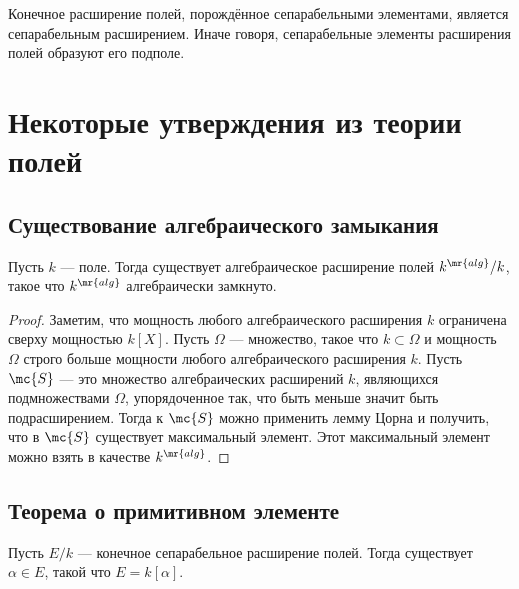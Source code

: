 \documentclass[
	extrafontsizes,
	11pt,
	hyphens,
]{memoir}
\begin{document}
\begin{corollary}
Конечное расширение полей, порождённое сепарабельными элементами, является сепарабельным расширением.
Иначе говоря, сепарабельные элементы расширения полей образуют его подполе.
\end{corollary}


\section{Некоторые утверждения из теории полей}

\subsection{Существование алгебраического замыкания}

\begin{theorem}
Пусть \(k\) --- поле. Тогда существует алгебраическое расширение полей \(k^{\mr{alg}} / k\), такое что \(k^{\mr{alg}}\) алгебраически замкнуто.
\end{theorem}

\begin{proof}
Заметим, что мощность любого алгебраического расширения \(k\) ограничена сверху мощностью \(k[X]\).
Пусть \(\Omega\) --- множество, такое что \(k \subset \Omega\) и мощность \(\Omega\) строго больше мощности любого алгебраического расширения \(k\).
Пусть \(\mc{S}\) --- это множество алгебраических расширений \(k\), являющихся подмножествами \(\Omega\), упорядоченное так, что быть меньше значит быть подрасширением.
Тогда к \(\mc{S}\) можно применить лемму Цорна и получить, что в \(\mc{S}\) существует максимальный элемент.
Этот максимальный элемент можно взять в качестве \(k^{\mr{alg}}\).
\end{proof}

\subsection{Теорема о примитивном элементе}


\begin{theorem}
Пусть \(E/k\) --- конечное сепарабельное расширение полей. Тогда существует \(\alpha \in E\), такой что \(E = k[\alpha]\). 
\end{theorem}
\end{document}
